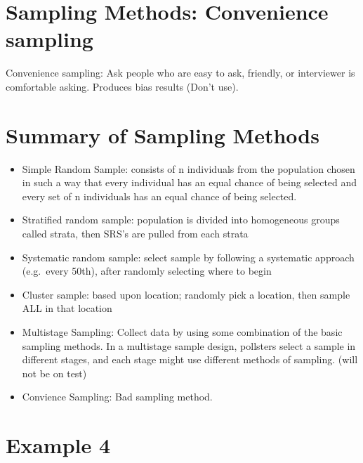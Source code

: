 \documentclass[]{book}
\providecommand{\tightlist}{%
  \setlength{\itemsep}{0pt}\setlength{\parskip}{0pt}}
\begin{document}
\hypertarget{sampling-methods-convenience-sampling}{%
\section{Sampling Methods: Convenience sampling}\label{sampling-methods-convenience-sampling}}

Convenience sampling: Ask people who are easy to ask, friendly, or interviewer is comfortable asking. Produces bias results (Don't use).

\hypertarget{summary-of-sampling-methods}{%
\section{Summary of Sampling Methods}\label{summary-of-sampling-methods}}

\begin{itemize}
\tightlist
\item
  Simple Random Sample: consists of n individuals from the population chosen in such a way that every individual has an equal chance of being selected and every set of n individuals has an equal chance of being selected.
\item
  Stratified random sample: population is divided into homogeneous groups called strata, then SRS's are pulled from each strata
\item
  Systematic random sample: select sample by following a systematic approach (e.g.~every 50th), after randomly selecting where to begin
\item
  Cluster sample: based upon location; randomly pick a location, then sample ALL in that location
\item
  Multistage Sampling: Collect data by using some combination of the basic sampling methods. In a multistage sample design, pollsters select a sample in different stages, and each stage might use different methods of sampling. (will not be on test)
\item
  Convience Sampling: Bad sampling method.
\end{itemize}

\hypertarget{example-4}{%
\section{Example 4}\label{example-4}}
\end{document}
